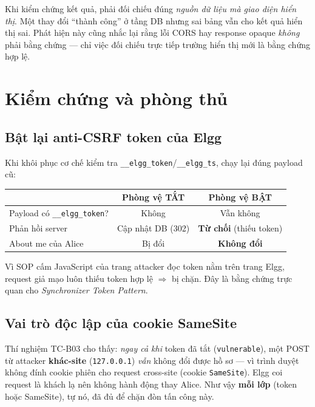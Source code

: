 \documentclass[11pt,a4paper]{article}
\begin{document}
\begin{infobox}
Khi kiểm chứng kết quả, phải đối chiếu đúng \emph{nguồn dữ liệu mà giao diện hiển thị}. Một thay đổi ``thành công'' ở tầng DB nhưng sai bảng vẫn cho kết quả hiển thị sai. Phát hiện này cũng nhắc lại rằng lỗi CORS hay response opaque \emph{không} phải bằng chứng — chỉ việc đối chiếu trực tiếp trường hiển thị mới là bằng chứng hợp lệ.
\end{infobox}

\section{Kiểm chứng và phòng thủ}\label{sec:defense}
\subsection{Bật lại anti-CSRF token của Elgg}
Khi khôi phục cơ chế kiểm tra \texttt{\_\_elgg\_token}/\texttt{\_\_elgg\_ts}, chạy lại đúng payload cũ:
\begin{center}\small
\begin{tabularx}{\linewidth}{@{}Y C C@{}}
\toprule
 & \textbf{Phòng vệ TẮT} & \textbf{Phòng vệ BẬT}\\
\midrule
Payload có \texttt{\_\_elgg\_token}? & Không & Vẫn không\\
Phản hồi server & Cập nhật DB (302) & \textbf{Từ chối} (thiếu token)\\
About me của Alice & Bị đổi & \textbf{Không đổi}\\
\bottomrule
\end{tabularx}
\end{center}
\noindent Vì SOP cấm JavaScript của trang attacker đọc token nằm trên trang Elgg, request giả mạo luôn thiếu token hợp lệ $\Rightarrow$ bị chặn. Đây là bằng chứng trực quan cho \emph{Synchronizer Token Pattern}.

\subsection{Vai trò độc lập của cookie SameSite}
Thí nghiệm TC-B03 cho thấy: \emph{ngay cả khi} token đã tắt (\texttt{vulnerable}), một POST từ attacker \textbf{khác-site} (\texttt{127.0.0.1}) \emph{vẫn} không đổi được hồ sơ — vì trình duyệt không đính cookie phiên cho request cross-site (cookie \texttt{SameSite}). Elgg coi request là khách lạ nên không hành động thay Alice. Như vậy \textbf{mỗi lớp} (token hoặc SameSite), tự nó, đã đủ để chặn đòn tấn công này.
\end{document}
